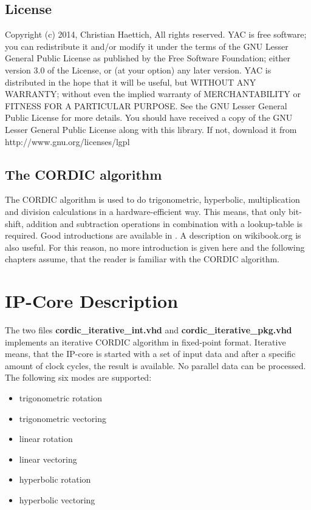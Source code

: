 \documentclass[a4paper, 12pt, notitlepage]{report}
\newcommand{\file}[1]{\textbf{#1}}
\begin{document}
\section{License}
Copyright (c) 2014, Christian Haettich, All rights reserved. \newline\newline 
YAC is free software; you can redistribute it and/or               
modify it under the terms of the GNU Lesser General Public         
License as published by the Free Software Foundation; either       
version 3.0 of the License, or (at your option) any later version. \newline\newline
YAC is distributed in the hope that it will be useful,             
but WITHOUT ANY WARRANTY; without even the implied warranty of     
MERCHANTABILITY or FITNESS FOR A PARTICULAR PURPOSE.  See the GNU  
Lesser General Public License for more details.              \newline\newline
You should have received a copy of the GNU Lesser General Public   
License along with this library. If not, download it from          
http://www.gnu.org/licenses/lgpl                                   


\section{The CORDIC algorithm}

The CORDIC algorithm is used to do trigonometric, hyperbolic, multiplication 
and division calculations in a hardware-efficient way. This means, that
only bit-shift, addition and subtraction operations in combination
with a lookup-table is required.\newline
Good introductions are available in \cite{survey}\cite{vlsi}\cite{dawid}.
A description on wikibook.org \cite{wikibook} is also useful.
For this reason, no more introduction is given here and the following chapters assume, that
the reader is familiar with the CORDIC algorithm.


\chapter{IP-Core Description}

The two files \file{cordic\_iterative\_int.vhd} and \file{cordic\_iterative\_pkg.vhd}
implements an iterative CORDIC algorithm in fixed-point format. 
Iterative means, that the IP-core is started with a set of input data and after
a specific amount of clock cycles, the result is available. No parallel data
can be processed. The 
following six modes are supported:
\begin{itemize}
   \item trigonometric rotation
   \item trigonometric vectoring
   \item linear rotation
   \item linear vectoring
   \item hyperbolic rotation
   \item hyperbolic vectoring
\end{itemize}
\end{document}

